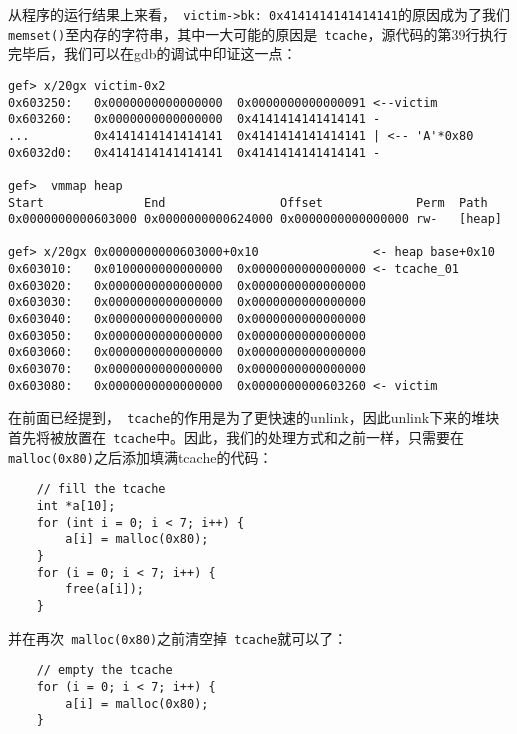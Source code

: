 从程序的运行结果上来看，\verb+ victim->bk: 0x4141414141414141+的原因成为了我们\verb+ memset()+至内存的字符串，其中一大可能的原因是\verb+ tcache+，源代码的第39行执行完毕后，我们可以在gdb的调试中印证这一点：
\begin{verbatim}
gef> x/20gx victim-0x2
0x603250:   0x0000000000000000  0x0000000000000091 <--victim
0x603260:   0x0000000000000000  0x4141414141414141 -
...         0x4141414141414141  0x4141414141414141 | <-- 'A'*0x80
0x6032d0:   0x4141414141414141  0x4141414141414141 -

gef>  vmmap heap
Start              End                Offset             Perm  Path
0x0000000000603000 0x0000000000624000 0x0000000000000000 rw-   [heap]

gef> x/20gx 0x0000000000603000+0x10                <- heap base+0x10
0x603010:   0x0100000000000000  0x0000000000000000 <- tcache_01
0x603020:   0x0000000000000000  0x0000000000000000
0x603030:   0x0000000000000000  0x0000000000000000
0x603040:   0x0000000000000000  0x0000000000000000
0x603050:   0x0000000000000000  0x0000000000000000
0x603060:   0x0000000000000000  0x0000000000000000
0x603070:   0x0000000000000000  0x0000000000000000
0x603080:   0x0000000000000000  0x0000000000603260 <- victim
\end{verbatim}

在前面已经提到，\verb+ tcache+的作用是为了更快速的unlink，因此unlink下来的堆块首先将被放置在\verb+ tcache+中。因此，我们的处理方式和之前一样，只需要在\verb+ malloc(0x80)+之后添加填满tcache的代码：
\begin{verbatim}
    // fill the tcache
    int *a[10];
    for (int i = 0; i < 7; i++) {
        a[i] = malloc(0x80);
    }
    for (i = 0; i < 7; i++) {
        free(a[i]);
    }
\end{verbatim}

并在再次\verb+ malloc(0x80)+之前清空掉\verb+ tcache+就可以了：
\begin{verbatim}
    // empty the tcache
    for (i = 0; i < 7; i++) {
        a[i] = malloc(0x80);
    }    
\end{verbatim}

